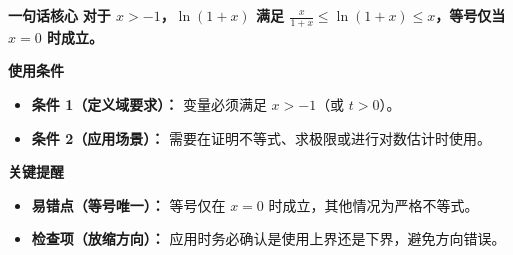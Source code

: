 \begin{summarybox}
\textbf{\textcolor{CSummary}{一句话核心}}
\textbf{对于 $x>-1$，$\ln(1+x)$ 满足 $\frac{x}{1+x} \le \ln(1+x) \le x$，等号仅当 $x=0$ 时成立。}

\medskip
\textbf{\textcolor{CSummary}{使用条件}}
\begin{itemize}[leftmargin=*, itemsep=0.5em, topsep=0.4em]
    \item \textbf{条件 1（定义域要求）：} 变量必须满足 $x > -1$（或 $t > 0$）。
    \item \textbf{条件 2（应用场景）：} 需要在证明不等式、求极限或进行对数估计时使用。
\end{itemize}

\medskip
\textbf{\textcolor{CSummary}{关键提醒}}
\begin{itemize}[leftmargin=*, itemsep=0.5em, topsep=0.4em]
    \item \textbf{易错点（等号唯一）：} 等号仅在 $x=0$ 时成立，其他情况为严格不等式。
    \item \textbf{检查项（放缩方向）：} 应用时务必确认是使用上界还是下界，避免方向错误。
\end{itemize}
\end{summarybox}
